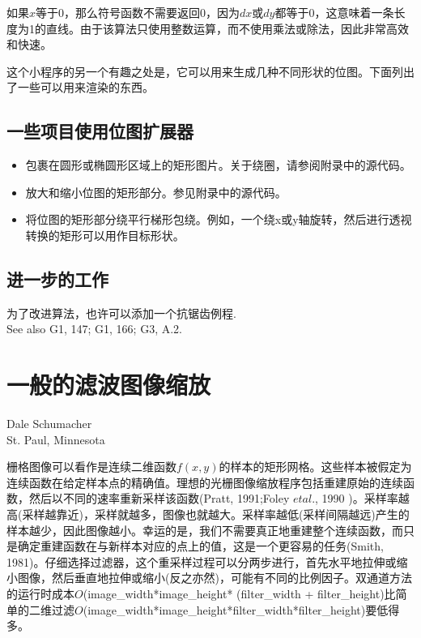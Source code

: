 \begin{CJK}{UTF8}{gbsn}
如果$x$等于0，那么符号函数不需要返回0，因为$dx$或$dy$都等于0，这意味着一条长度为1的直线。由于该算法只使用整数运算，而不使用乘法或除法，因此非常高效和快速。


这个小程序的另一个有趣之处是，它可以用来生成几种不同形状的位图。下面列出了一些可以用来渲染的东西。
\subsection*{一些项目使用位图扩展器}
\begin{itemize}
	\item 包裹在圆形或椭圆形区域上的矩形图片。关于绕圈，请参阅附录中的源代码。
	\item 放大和缩小位图的矩形部分。参见附录中的源代码。
	\item 将位图的矩形部分绕平行梯形包绕。例如，一个绕x或y轴旋转，然后进行透视转换的矩形可以用作目标形状。
\end{itemize}


\subsection*{进一步的工作}
为了改进算法，也许可以添加一个抗锯齿例程.\\
See also G1, 147; G1, 166; G3, A.2.




\newpage
\section{一般的滤波图像缩放}
\begin{center}
\small{
Dale Schumacher\\
St. Paul, Minnesota}
\end{center}


栅格图像可以看作是连续二维函数$f(x, y)$的样本的矩形网格。这些样本被假定为连续函数在给定样本点的精确值。理想的光栅图像缩放程序包括重建原始的连续函数，然后以不同的速率重新采样该函数(Pratt, 1991;Foley $ et al$., 1990 )。采样率越高(采样越靠近)，采样就越多，图像也就越大。采样率越低(采样间隔越远)产生的样本越少，因此图像越小。幸运的是，我们不需要真正地重建整个连续函数，而只是确定重建函数在与新样本对应的点上的值，这是一个更容易的任务(Smith, 1981)。仔细选择过滤器，这个重采样过程可以分两步进行，首先水平地拉伸或缩小图像，然后垂直地拉伸或缩小(反之亦然)，可能有不同的比例因子。双通道方法的运行时成本$O$(image\_width*image\_height* (filter\_width + filter\_height)比简单的二维过滤$O$(image\_width*image\_height*filter\_width*filter\_height)要低得多。


\end{CJK}

